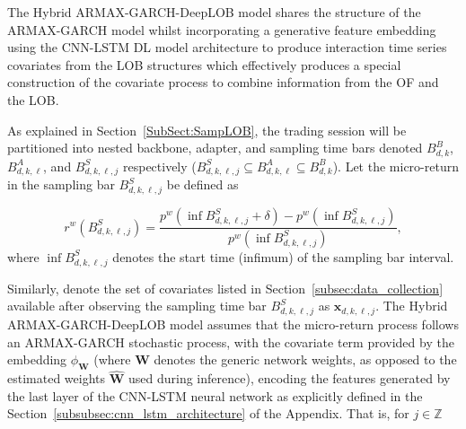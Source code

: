 \documentclass[10pt,a4paper,oneside]{article}
\newcommand{\Z}{\mathbb{Z}}
\begin{document}
The Hybrid ARMAX-GARCH-DeepLOB model shares the structure of the ARMAX-GARCH model whilst incorporating a generative feature embedding using the CNN-LSTM DL model architecture to produce interaction time series covariates from the LOB structures which effectively produces a special construction of the covariate process to combine information from the OF and the LOB.

As explained in Section~\ref{SubSect:SampLOB}, the trading session will be partitioned into nested backbone, adapter, and sampling time bars denoted $B^B_{d,k}$, $B^A_{d,k,\ell}$, and $B^S_{d,k,\ell,j}$ respectively ($B^S_{d,k,\ell,j} \subseteq B^A_{d,k,\ell} \subseteq B^B_{d,k}$). Let the micro-return in the sampling bar $B^S_{d, k, \ell, j}$ be defined as

$$
    r^w\left( B^S_{d, k, \ell, j} \right) = \frac{p^w\left( \inf B^S_{d, k, \ell, j} + \delta \right) - p^w\left( \inf B^S_{d, k, \ell, j}\right)}{p^w\left( \inf B^S_{d, k, \ell, j}\right)},
$$
where $\inf B^S_{d, k, \ell, j}$ denotes the start time (infimum) of the sampling bar interval.

Similarly, denote the set of covariates listed in Section~\ref{subsec:data_collection} available after observing the sampling time bar $B^S_{d, k, \ell, j}$ as $\mathbf{x}_{d, k, \ell, j}$. The Hybrid ARMAX-GARCH-DeepLOB model assumes that the micro-return process follows an ARMAX-GARCH stochastic process, with the covariate term provided by the embedding $\phi_{\mathbf{W}}$ (where $\mathbf{W}$ denotes the generic network weights, as opposed to the estimated weights $\hat{\mathbf{W}}$ used during inference), encoding the features generated by the last layer of the CNN-LSTM neural network as explicitly defined in the Section~\ref{subsubsec:cnn_lstm_architecture} of the Appendix. That is, for $j \in \Z$
\end{document}
